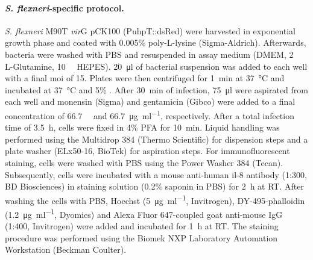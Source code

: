 \paragraph{\textit{S. flexneri}-specific protocol.}
\textit{S. flexneri} M90T \textDelta\textit{vir}G pCK100 (PuhpT::dsRed) were harvested in exponential growth phase and coated with 0.005\% poly-L-lysine (Sigma-Aldrich). Afterwards, bacteria were washed with PBS and resuspended in assay medium (DMEM, \SI{2}{\milli\Molar} L-Glutamine, \SI{10}{\milli\Molar} HEPES). \SI{20}{\micro\litre} of bacterial suspension was added to each well with a final \gls{moi} of 15. Plates were then centrifuged for \SI{1}{\minute} at \SI{37}{\celsius} and incubated at \SI{37}{\celsius} and 5\% . After \SI{30}{\minute} of infection, \SI{75}{\micro\litre} were aspirated from each well and monensin (Sigma) and gentamicin (Gibco) were added to a final concentration of \SI{66.7}{\micro\Molar} and \SI{66.7}{\micro\gram\per\milli\litre}, respectively. After a total infection time of \SI{3.5}{\hour}, cells were fixed in 4\% PFA for \SI{10}{\minute}. Liquid handling was performed using the Multidrop 384 (Thermo Scientific) for dispension steps and a plate washer (ELx50-16, BioTek) for aspiration steps. For immunofluorescent staining, cells were washed with PBS using the Power Washer 384 (Tecan). Subsequently, cells were incubated with a mouse anti-human \gls{il-8} antibody (1:300, BD Biosciences) in staining solution (0.2\% saponin in PBS) for \SI{2}{\hour} at RT. After washing the cells with PBS, Hoechst (\SI{5}{\micro\gram\per\milli\litre}, Invitrogen), DY-495-phalloidin (\SI{1.2}{\micro\gram\per\milli\litre}, Dyomics) and Alexa Fluor 647-coupled goat anti-mouse IgG (1:400, Invitrogen) were added and incubated for \SI{1}{\hour} at RT. The staining procedure was performed using the Biomek NXP Laboratory Automation Workstation (Beckman Coulter).

